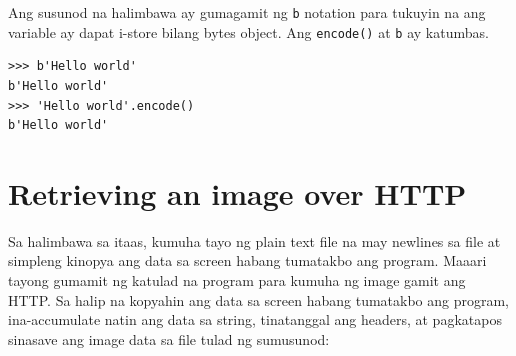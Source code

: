 \documentclass[10pt,]{book}
\begin{document}
Ang susunod na halimbawa ay gumagamit ng
\texttt{b\textquotesingle{}\textquotesingle{}} notation para tukuyin na
ang variable ay dapat i-store bilang bytes object. Ang \texttt{encode()}
at \texttt{b\textquotesingle{}\textquotesingle{}} ay katumbas.

{\small
\begin{verbatim}
>>> b'Hello world'
b'Hello world'
>>> 'Hello world'.encode()
b'Hello world'
\end{verbatim}
}

\section{Retrieving an image over
HTTP}\label{retrieving-an-image-over-http}

  

Sa halimbawa sa itaas, kumuha tayo ng plain text file na may newlines sa
file at simpleng kinopya ang data sa screen habang tumatakbo ang
program. Maaari tayong gumamit ng katulad na program para kumuha ng
image gamit ang HTTP. Sa halip na kopyahin ang data sa screen habang
tumatakbo ang program, ina-accumulate natin ang data sa string,
tinatanggal ang headers, at pagkatapos sinasave ang image data sa file
tulad ng sumusunod:
\end{document}
